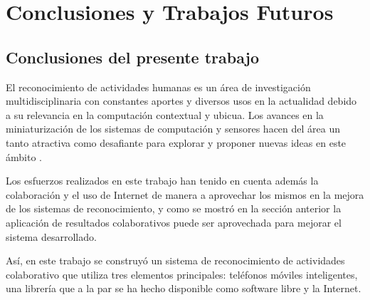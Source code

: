 
\chapter{Conclusiones y Trabajos Futuros}

\label{cap8:conclusiones-y-trabajos-futuros}

\section{Conclusiones del presente trabajo}

\label{sec81:conclusiones}El reconocimiento de actividades humanas
es un área de investigación multidisciplinaria con constantes aportes
y diversos usos en la actualidad debido a su relevancia en la computación
contextual y ubicua. Los avances en la miniaturización de los sistemas
de computación y sensores hacen del área un tanto atractiva como desafiante
para explorar y proponer nuevas ideas en este ámbito \cite{LaraLabrador2013}. 

Los esfuerzos realizados en este trabajo han tenido en cuenta además
la colaboración y el uso de Internet de manera a aprovechar los mismos
en la mejora de los sistemas de reconocimiento, y como se mostró en
la sección anterior la aplicación de resultados colaborativos puede
ser aprovechada para mejorar el sistema desarrollado. 

Así, en este trabajo se construyó un sistema de reconocimiento de
actividades colaborativo que utiliza tres elementos principales: teléfonos
móviles inteligentes, una librería que a la par se ha hecho disponible
como software libre y la Internet. 

